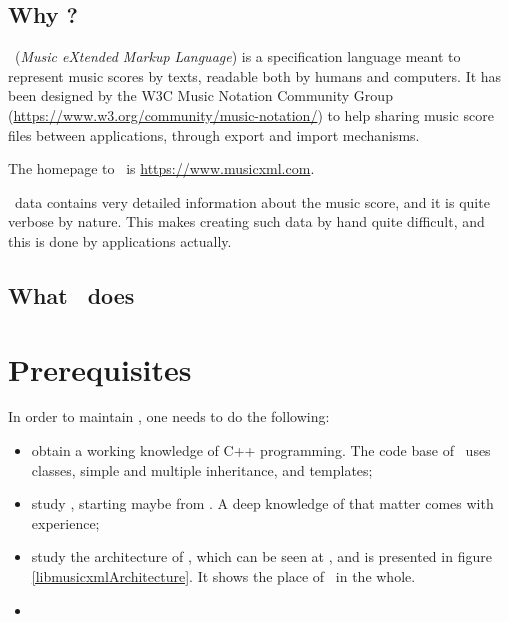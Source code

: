 \documentclass[12pt,a4paper]{article}
\begin{document}
\subsection{Why \xmlToLy?}

\mxml\ ({\it Music eXtended Markup Language}) is a specification language meant to represent music scores by texts, readable both by humans and computers. It has been designed by the W3C Music Notation Community Group (\url{https://www.w3.org/community/music-notation/}) to help sharing music score files between applications, through export and import mechanisms.

The homepage to \mxml\ is \url{https://www.musicxml.com}.

\mxml\ data contains very detailed information about the music score, and it is quite verbose by nature. This makes creating such data by hand quite difficult, and this is done by applications actually.

\subsection{What \xmlToLy\ does}


\section{Prerequisites}

In order to maintain \xmlToLy, one needs to do the following:
\begin{itemize}
\item obtain a working knowledge of C++ programming. The code base of \xmlToLy\ uses classes, simple and multiple inheritance, and templates;

\item study \mxml, starting maybe from . A deep knowledge of that matter comes with experience;

\item study the architecture of \lib, which can be seen at , and is presented in figure \ref{libmusicxmlArchitecture}.
It shows the place of \xmlToLy\ in the whole.

\item
\end{itemize}
\end{document}
